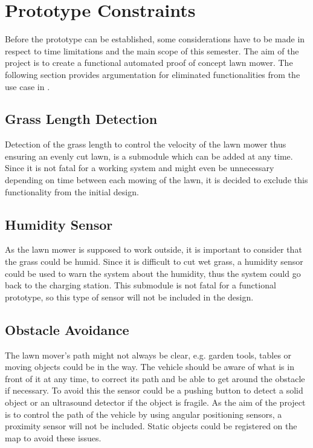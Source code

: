 \section{Prototype Constraints}\label{sec:PrototypeConstraints}
Before the prototype can be established, some considerations have to be made in respect to time limitations and the main scope of this semester. The aim of the project is to create a functional automated proof of concept lawn mower. The following section provides argumentation for eliminated functionalities from the use case in .

\subsection{Grass Length Detection}
Detection of the grass length to control the velocity of the lawn mower thus ensuring an evenly cut lawn, is a submodule which can be added at any time. Since it is not fatal for a working system and might even be unnecessary depending on time between each mowing of the lawn, it is decided to exclude this functionality from the initial design.

\subsection{Humidity Sensor}
As the lawn mower is supposed to work outside, it is important to consider that the grass could be humid. Since it is difficult to cut wet grass, a humidity sensor could be used to warn the system about the humidity, thus the system could go back to the charging station. This submodule is not fatal for a functional prototype, so this type of sensor will not be included in the design.

\subsection{Obstacle Avoidance}
The lawn mover's path might not always be clear, e.g. garden tools, tables or moving objects could be in the way. The vehicle should be aware of what is in front of it at any time, to correct its path and be able to get around the obstacle if necessary. To avoid this the sensor could be a pushing button to detect a solid object or an ultrasound detector if the object is fragile.
As the aim of the project is to control the path of the vehicle by using angular positioning sensors, a proximity sensor will not be included. Static objects could be registered on the map to avoid these issues.

